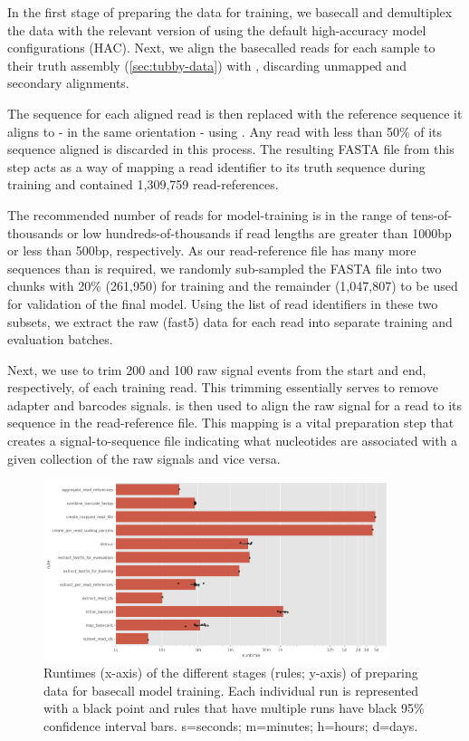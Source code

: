 In the first stage of preparing the data for training, we basecall and demultiplex the data with the relevant version of \guppy{} using the default high-accuracy model configurations (HAC). Next, we align the basecalled reads for each sample to their truth assembly (\autoref{sec:tubby-data}) with  \cite{li2018}, discarding unmapped and secondary alignments.

The sequence for each aligned read is then replaced with the reference sequence it aligns to - in the same orientation - using \taiyaki{}. Any read with less than 50\%  of its sequence aligned is discarded in this process. The resulting FASTA file from this step acts as a way of mapping a read identifier to its truth sequence during training and contained 1,309,759 read-references.

The recommended number of reads for \taiyaki{} model-training is in the range of tens-of-thousands or low hundreds-of-thousands if read lengths are greater than 1000bp or less than 500bp, respectively. As our read-reference file has many more sequences than is required, we randomly sub-sampled the FASTA file into two chunks with 20\% (261,950) for training and the remainder (1,047,807) to be used for validation of the final model. Using the list of read identifiers in these two subsets, we extract the raw (fast5) data for each read into separate training and evaluation batches. 

Next, we use \taiyaki{} to trim 200 and 100 raw signal events from the start and end, respectively, of each training read. This trimming essentially serves to remove adapter and barcodes signals. \taiyaki{} is then used to align the raw signal for a read to its sequence in the read-reference file. This mapping is a vital preparation step that creates a signal-to-sequence file indicating what nucleotides are associated with a given collection of the raw signals and vice versa.

\begin{figure}
\includegraphics[width=0.9\textwidth]{Chapter4/Figs/prep_runtime.png}
\centering
\caption{Runtimes (x-axis) of the different stages (rules; y-axis) of preparing data for basecall model training. Each individual run is represented with a black point and rules that have multiple runs have black 95\% confidence interval bars. s=seconds; m=minutes; h=hours; d=days.}
\label{fig:prep_runtime}
\end{figure}


